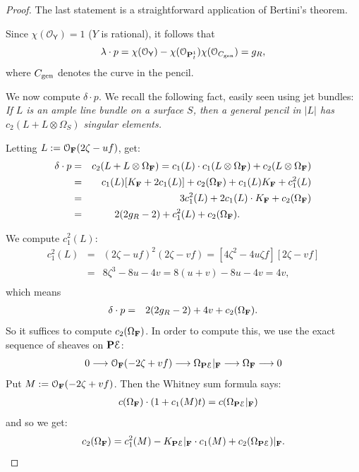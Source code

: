 \documentclass[reqno, 10 pt]{article}
\theoremstyle{definition}
\theoremstyle{remark}
\numberwithin{equation}{section}
\numberwithin{thm}{section}
\numberwithin{prop}{section}
\numberwithin{lem}{section}
\numberwithin{cor}{section}
\numberwithin{conj}{section}
\numberwithin{defn}{section}
\newcommand{\F}{{\mathbf F}}
\renewcommand{\to}{\longrightarrow}
\newcommand{\sfY}{{\mathsf Y}}
\newcommand{\cE}{{\mathcal E}}
\newcommand{\cO}{{\mathcal O}}
\renewcommand{\F}{{\bf F}}
\newcommand {\gen}{{\rm gen}}
\renewcommand {\gen}{{\rm gen}}
\begin{document}
\begin{proof}
The last statement is a straightforward application of Bertini's theorem. 

Since $\chi(\cO_{\sfY}) = 1$ ($Y$ is rational), it follows that \[\lambda \cdot p = \chi(\cO_{\sfY}) - \chi(\cO_{{\bf P}^1_t})\chi(\cO_{C_{\gen}}) = g_R,\] where $C_{\gen}$ denotes the curve in the pencil. 

We now compute $\delta \cdot p$.  We recall the following fact, easily seen using jet bundles: {\sl If $L$ is an ample line bundle on a surface $S$, then a general pencil in $|L|$ has $c_{2}(L + L \otimes \Omega_{S})$ singular elements.}

 Letting $L := \cO_\F (2\zeta-uf)$, get:
\begin{eqnarray*}
\delta \cdot p &=& c_2(L + L \otimes \Omega_\F) = c_1(L) \cdot c_1(L \otimes \Omega_\F)+ c_2(L \otimes \Omega_\F)\\
&=&c_1(L) [K_\F + 2c_1(L)] + c_2(\Omega_\F) + c_1(L) K_\F + c_1^2(L)\\
&=& 3c_1^2(L) + 2c_1(L) \cdot K_\F + c_2(\Omega_{\F})\\
&=& 2(2g_R-2) + c_1^2(L) +  c_2(\Omega_{\F}). \hspace{1 in} 
\end{eqnarray*}

We compute $c_{1}^{2}(L)$:
\begin{eqnarray*}
c_1^2(L) &=& (2\zeta - uf)^2(2\zeta-vf) = [4\zeta^2 - 4u\zeta f][2\zeta - vf]\\
 &=& 8\zeta^3 - 8u - 4v = 8(u+v)-8u-4v = 4v,\\
 \end{eqnarray*}
 which means 
 \begin{eqnarray*}
 \delta \cdot p  &=& 2(2g_R-2) +4v + c_2(\Omega_{\F}).
\end{eqnarray*}
So it suffices to compute $c_2(\Omega_{\F})$. In order to compute this, we use the exact sequence of sheaves on $ {\bf P}\cE$: \[0 \to \cO_{\F}(-2\zeta +vf) \to \Omega_{{\bf P}\cE}|_{\F} \to \Omega_{\F} \to 0\] Put $M :=  \cO_{\F}(-2\zeta +vf)$. Then the Whitney sum formula says:
\begin{eqnarray*}
&&c(\Omega_{\F}) \cdot (1 + c_1(M)t) = c(\Omega_{{\bf P}\cE}|_{\F})\\
\end{eqnarray*} and so we get:
\begin{eqnarray*}
 c_2(\Omega_{\F}) = c_1^2(M) - K_{{\bf P}\cE}|_{\F} \cdot c_1(M) + c_2(\Omega_{{\bf P}\cE})|_{\F}.
\end{eqnarray*}


\end{proof}
\end{document}
